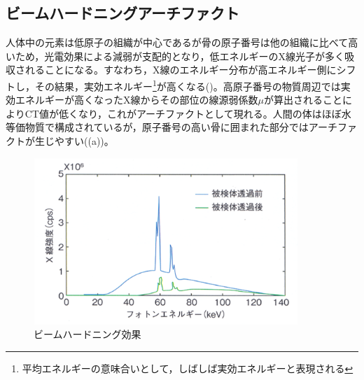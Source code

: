\subsection{ビームハードニングアーチファクト}
人体中の元素は低原子の組織が中心であるが骨の原子番号は他の組織に比べて高いため，光電効果による減弱が支配的となり，低エネルギーのX線光子が多く吸収されることになる。すなわち，X線のエネルギー分布が高エネルギー側にシフトし，その結果，実効エネルギー\footnote{平均エネルギーの意味合いとして，しばしば実効エネルギーと表現される}が高くなる()。高原子番号の物質周辺では実効エネルギーが高くなったX線からその部位の線源弱係数$\mu$が算出されることによりCT値が低くなり，これがアーチファクトとして現れる。人間の体はほぼ水等価物質で構成されているが，原子番号の高い骨に囲まれた部分ではアーチファクトが生じやすい((a))。

\begin{figure}[H]
 \begin{minipage}{1\hsize}
  \begin{center}
   \includegraphics[width=10cm]{image/other/beam_hard.eps}
  \end{center}
  \vspace{-0.9cm}\hspace{8cm}
  
 \end{minipage}
 \begin{center}
  \vspace{-1zh}
  \caption{ビームハードニング効果\cite{spectralCT}}
  \label{fig:beam_hard}
  \end{center}
\end{figure}






